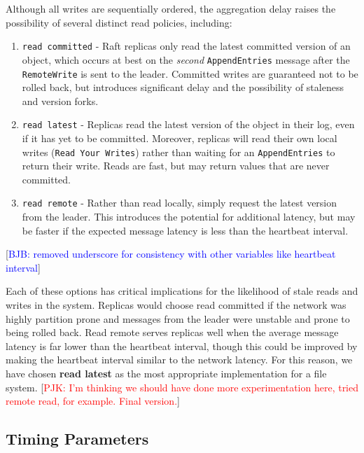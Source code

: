 \documentclass[10pt,conference,letterpaper]{IEEEtran}
\newcommand{\todo}[1]{{\textcolor{red}{#1}}}
\newcommand{\blue}[1]{{\textcolor{blue}{#1}}}
\newcommand{\pjk}[1]{[\todo{PJK: #1}]}
\newcommand{\bjb}[1]{[\blue{BJB: #1}]}
\begin{document}
Although all writes are sequentially ordered, the aggregation delay raises the possibility
of several distinct read policies, including:
\begin{enumerate}
    \item \texttt{read committed} - Raft replicas only read the latest committed version
of an object, which occurs at best on the \emph{second} \texttt{AppendEntries} message
after the \texttt{RemoteWrite} is sent to the leader. Committed writes are guaranteed not
to be rolled back, but introduces significant delay and the possibility of staleness and
version forks.
    \item \texttt{read latest} - Replicas read the latest version of the object
in their log, even if it has yet to be committed.
Moreover, replicas will read their own local writes (\texttt{Read Your Writes}) rather than waiting for an
\texttt{AppendEntries} to return their write. Reads are fast, but may return values that
are never committed.
    \item \texttt{read remote} - Rather than read locally, simply request the latest
version from the leader.
This introduces the potential for additional latency, but may be faster if the expected
message latency is less than the heartbeat interval.
\end{enumerate}
\bjb{removed underscore for consistency with other variables like heartbeat interval}

Each of these options has critical implications for the likelihood of stale reads and
writes in the system.
Replicas would choose read committed if the network was highly partition prone and
messages from the leader were unstable and prone to being rolled back.
Read remote serves replicas well when the average message latency is far lower than the
heartbeat interval, though this could be improved by making the heartbeat interval similar
to the network latency.
For this reason, we have chosen \textbf{read latest} as the most appropriate implementation for a file
system.
\pjk{I'm thinking we should have done more experimentation here, tried remote read, for
  example. Final version.}

\subsection{Timing Parameters}
\end{document}
